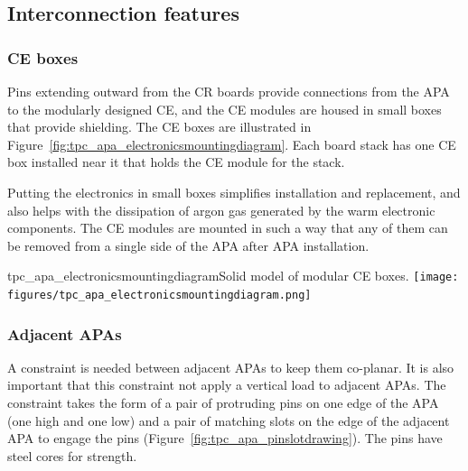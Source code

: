 \subsection{Interconnection features}

\subsubsection{CE boxes}

Pins extending outward from the CR boards provide connections from the APA to the modularly designed CE, and the CE modules are housed in small boxes that provide shielding.
The CE boxes are illustrated in Figure~\ref{fig:tpc_apa_electronicsmountingdiagram}. 
Each board stack has one CE box installed near it that holds the CE module for the stack.  

Putting the electronics in small boxes simplifies installation and replacement, and also helps with the dissipation 
of argon gas generated by the warm electronic components.  The CE modules are mounted in such a way that any of them can be removed from a single side of the APA after APA installation.

\begin{cdrfigure}{tpc_apa_electronicsmountingdiagram}{Solid model of %
modular CE boxes.}
\texttt{[image: figures/tpc\_apa\_electronicsmountingdiagram.png]} 
\end{cdrfigure}

\subsubsection{Adjacent APAs}

A constraint is needed between adjacent APAs to keep them co-planar.  It is also important that this constraint not apply a vertical load to adjacent APAs.  The constraint takes the form of 
 a pair of protruding pins on one edge of the APA (one high and one low) and a pair of matching slots %
on the edge of the adjacent APA
to engage the pins (Figure~\ref{fig:tpc_apa_pinslotdrawing}). The pins have steel cores for strength.


